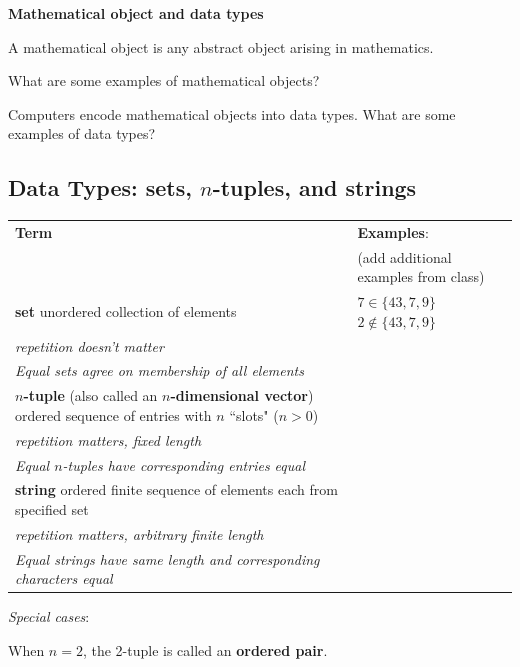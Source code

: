 \documentclass[12pt, oneside]{article}
\begin{document}
{\bf Mathematical object and data types}

A mathematical object is any abstract object arising in mathematics.

What are some examples of mathematical objects?

\vfill

Computers encode mathematical objects into data types. What are some examples of data types?

\vfill

\newpage

\subsection*{Data Types: sets, $n$-tuples, and strings}


\begin{center}
    \begin{tabular}{p{4.6in}p{2.6in}}
    {\bf  Term} & {\bf Examples}:\\
    &  (add additional examples from class)\\
    \hline 
    {\bf set} \newline
    unordered collection of elements & $7 \in \{43, 7, 9 \}$ \qquad $2 \notin \{43, 7, 9 \}$ \\
    {\it repetition doesn't matter} & \\
    {\it Equal sets agree on membership of all elements}& \\
    \hline
    {\bf $n$-tuple} (also called an {\bf $n$-dimensional vector}) \newline
    ordered sequence of entries with $n$ ``slots" ($n >0$) & \\
    {\it repetition matters, fixed length} &\\
    {\it Equal $n$-tuples have corresponding entries equal}& \\
    \hline
    {\bf string} \newline
    ordered finite sequence of elements each from specified
    set & \\
    {\it repetition matters, arbitrary finite length} &\\
    {\it Equal strings have same length and corresponding characters equal}
    \end{tabular}
\end{center}

{\it Special cases}: 

When $n=2$, the 2-tuple is called an {\bf ordered pair}.
\end{document}

